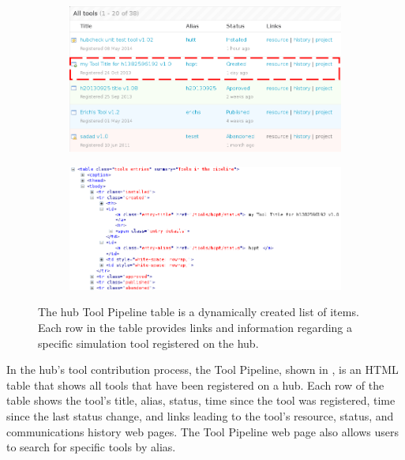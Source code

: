 \begin{figure}[ht!]
        \centering
        \begin{subfigure}[b]{0.75\textwidth}
                \centering
                \includegraphics[width=\textwidth]{../../images/hubzero_tool_pipeline_table.png}
        \end{subfigure}
        \begin{subfigure}[b]{0.75\textwidth}
                \centering
                \includegraphics[width=\textwidth]{../../images/hubzero_tool_pipeline_table_html.png}
        \end{subfigure}
        \caption{The hub Tool Pipeline table is a dynamically created list of items.
                 Each row in the table provides links and information regarding a
                 specific simulation tool registered on the hub.}
        \label{fig:itemlist_motivation_tool_pipeline_table}
\end{figure}


In the hub's tool contribution process, the Tool Pipeline, shown in
, is an HTML table that shows
all tools that have been registered on a hub. Each row of the table shows the
tool's title, alias, status, time since the tool was registered, time since the
last status change, and links leading to the tool's resource, status, and
communications history web pages. The Tool Pipeline web page also allows users
to search for specific tools by alias.


